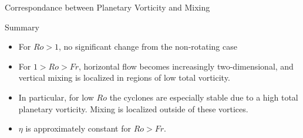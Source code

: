 \documentclass[aspecttatio=169]{beamer}
\begin{document}
\begin{frame}{Correspondance between Planetary Vorticity and Mixing}
    \emp

\end{frame}


\begin{frame}{Summary}

    \begin{itemize}
    \item For $Ro > 1$, no significant change from the non-rotating case
    \item For $1 > Ro > Fr$, horizontal flow becomes increasingly
    two-dimensional, and vertical mixing is localized in regions of low total
    vorticity. 
    \item In particular, for low $Ro$ the cyclones are especially stable due to
    a high total planetary vorticity. Mixing is localized outside of these
    vortices. 
    \item $\eta$ is approximately constant for $Ro > Fr$. 
    \end{itemize}

\end{frame}
\end{document}
